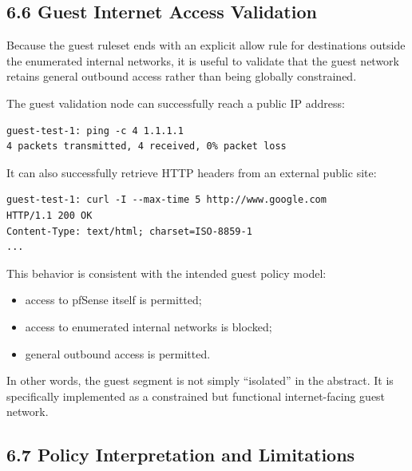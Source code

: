 \documentclass[11pt]{article}
\begin{document}
\subsection{6.6 Guest Internet Access Validation}
\label{sec:guest-internet-access-validation}

Because the guest ruleset ends with an explicit allow rule for destinations outside the enumerated internal networks, it is useful to validate that the guest network retains general outbound access rather than being globally constrained.

The guest validation node can successfully reach a public IP address:

\begin{verbatim}
guest-test-1: ping -c 4 1.1.1.1
4 packets transmitted, 4 received, 0% packet loss
\end{verbatim}

It can also successfully retrieve HTTP headers from an external public site:

\begin{verbatim}
guest-test-1: curl -I --max-time 5 http://www.google.com
HTTP/1.1 200 OK
Content-Type: text/html; charset=ISO-8859-1
...
\end{verbatim}

This behavior is consistent with the intended guest policy model:

\begin{itemize}
    \item access to pfSense itself is permitted;
    \item access to enumerated internal networks is blocked;
    \item general outbound access is permitted.
\end{itemize}

In other words, the guest segment is not simply ``isolated'' in the abstract. It is specifically implemented as a constrained but functional internet-facing guest network.


\subsection{6.7 Policy Interpretation and Limitations}
\label{sec:policy-interpretation-and-limitations}
\end{document}
